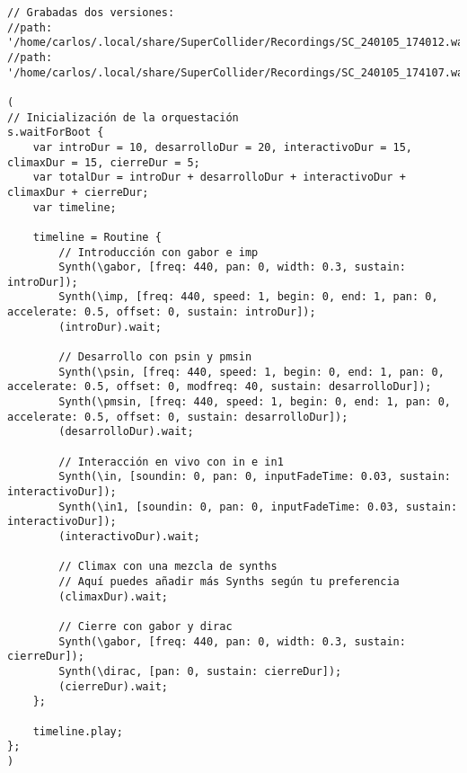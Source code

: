 




















\begin{minipage}[t]{1\textwidth}
    \centering
    \begin{lstlisting}[style=SuperCollider-IDE, basicstyle=\footnotesize\ttfamily, numbers=none]
// Grabadas dos versiones:
//path: '/home/carlos/.local/share/SuperCollider/Recordings/SC_240105_174012.wav'
//path: '/home/carlos/.local/share/SuperCollider/Recordings/SC_240105_174107.wav'

(
// Inicialización de la orquestación
s.waitForBoot {
    var introDur = 10, desarrolloDur = 20, interactivoDur = 15, climaxDur = 15, cierreDur = 5;
    var totalDur = introDur + desarrolloDur + interactivoDur + climaxDur + cierreDur;
    var timeline;

    timeline = Routine {
        // Introducción con gabor e imp
        Synth(\gabor, [freq: 440, pan: 0, width: 0.3, sustain: introDur]);
        Synth(\imp, [freq: 440, speed: 1, begin: 0, end: 1, pan: 0, accelerate: 0.5, offset: 0, sustain: introDur]);
        (introDur).wait;

        // Desarrollo con psin y pmsin
        Synth(\psin, [freq: 440, speed: 1, begin: 0, end: 1, pan: 0, accelerate: 0.5, offset: 0, modfreq: 40, sustain: desarrolloDur]);
        Synth(\pmsin, [freq: 440, speed: 1, begin: 0, end: 1, pan: 0, accelerate: 0.5, offset: 0, sustain: desarrolloDur]);
        (desarrolloDur).wait;

        // Interacción en vivo con in e in1
        Synth(\in, [soundin: 0, pan: 0, inputFadeTime: 0.03, sustain: interactivoDur]);
        Synth(\in1, [soundin: 0, pan: 0, inputFadeTime: 0.03, sustain: interactivoDur]);
        (interactivoDur).wait;

        // Climax con una mezcla de synths
        // Aquí puedes añadir más Synths según tu preferencia
        (climaxDur).wait;

        // Cierre con gabor y dirac
        Synth(\gabor, [freq: 440, pan: 0, width: 0.3, sustain: cierreDur]);
        Synth(\dirac, [pan: 0, sustain: cierreDur]);
        (cierreDur).wait;
    };

    timeline.play;
};
)                                     
    \end{lstlisting}
    \vspace{1cm}
\end{minipage}
